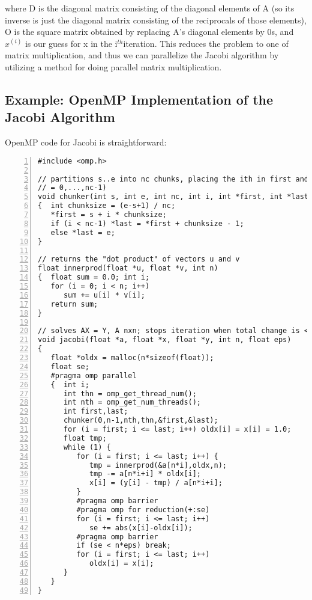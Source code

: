 where D is the diagonal matrix consisting of the diagonal elements of A
(so its inverse is just the diagonal matrix consisting of the
reciprocals of those elements),
O is the square matrix obtained by replacing A's diagonal elements by
0s, and $x^{(i)}$ is our guess for x in the i$^{th}$iteration.  This
reduces the problem to one of matrix multiplication, and thus we can
parallelize the Jacobi algorithm by utilizing a method for doing
parallel matrix multiplication.

\subsection{Example: OpenMP Implementation of the Jacobi Algorithm}
\label{ompjacobi}

OpenMP code for Jacobi is straightforward:

\begin{lstlisting}[numbers=left]
#include <omp.h>

// partitions s..e into nc chunks, placing the ith in first and last (i
// = 0,...,nc-1)
void chunker(int s, int e, int nc, int i, int *first, int *last)
{  int chunksize = (e-s+1) / nc;
   *first = s + i * chunksize;
   if (i < nc-1) *last = *first + chunksize - 1;
   else *last = e;
}

// returns the "dot product" of vectors u and v
float innerprod(float *u, float *v, int n)
{  float sum = 0.0; int i;
   for (i = 0; i < n; i++)
      sum += u[i] * v[i];
   return sum;
} 

// solves AX = Y, A nxn; stops iteration when total change is < n*eps
void jacobi(float *a, float *x, float *y, int n, float eps)
{
   float *oldx = malloc(n*sizeof(float));
   float se;
   #pragma omp parallel
   {  int i;
      int thn = omp_get_thread_num();
      int nth = omp_get_num_threads();
      int first,last;
      chunker(0,n-1,nth,thn,&first,&last);
      for (i = first; i <= last; i++) oldx[i] = x[i] = 1.0;
      float tmp;
      while (1) {
         for (i = first; i <= last; i++) {
            tmp = innerprod(&a[n*i],oldx,n);
            tmp -= a[n*i+i] * oldx[i];
            x[i] = (y[i] - tmp) / a[n*i+i];
         }
         #pragma omp barrier
         #pragma omp for reduction(+:se)
         for (i = first; i <= last; i++) 
            se += abs(x[i]-oldx[i]);
         #pragma omp barrier
         if (se < n*eps) break;
         for (i = first; i <= last; i++) 
            oldx[i] = x[i];
      }
   }
}
\end{lstlisting}

